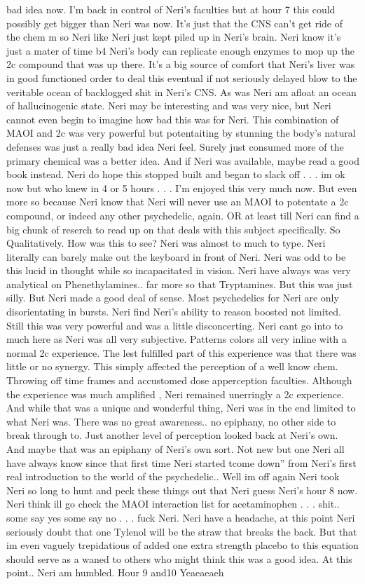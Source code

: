 \documentclass[12pt]{book}
\begin{document}
bad idea now. I'm back in control of Neri's faculties but at hour 7 this could possibly get bigger than Neri was now. It's just that the CNS can't get ride of the chem m so Neri like Neri just kept piled up in Neri's brain. Neri know it's just a mater of time b4 Neri's body can replicate enough enzymes to mop up the 2c compound that was up there. It's a big source of comfort that Neri's liver was in good functioned order to deal this eventual if not seriously delayed blow to the veritable ocean of backlogged shit in Neri's CNS. As was Neri am afloat an ocean of hallucinogenic state. Neri may be interesting and was very nice, but Neri cannot even begin to imagine how bad this was for Neri. This combination of MAOI and 2c was very powerful but potentaiting by stunning the body's natural defenses was just a really bad idea Neri feel. Surely just consumed more of the primary chemical was a better idea. And if Neri was available, maybe read a good book instead. Neri do hope this stopped built and began to slack off . . .  im ok now but who knew in 4 or 5 hours . . .  I'm enjoyed this very much now. But even more so because Neri know that Neri will never use an MAOI to potentate a 2c compound, or indeed any other psychedelic, again. OR at least till Neri can find a big chunk of reserch to read up on that deals with this subject specifically. So Qualitatively. How was this to see? Neri was almost to much to type. Neri literally can barely make out the keyboard in front of Neri. Neri was odd to be this lucid in thought while so incapacitated in vision. Neri have always was very analytical on Phenethylamines.. far more so that Tryptamines. But this was just silly. But Neri made a good deal of sense. Most psychedelics for Neri are only disorientating in bursts. Neri find Neri's ability to reason boosted not limited. Still this was very powerful and was a little disconcerting. Neri cant go into to much here as Neri was all very subjective. Patterns colors all very inline with a normal 2c experience. The lest fulfilled part of this experience was that there was little or no synergy. This simply affected the perception of a well know chem. Throwing off time frames and accustomed dose apperception faculties. Although the experience was much amplified , Neri remained unerringly a 2c experience. And while that was a unique and wonderful thing, Neri was in the end limited to what Neri was. There was no great awareness.. no epiphany, no other side to break through to. Just another level of perception looked back at Neri's own. And maybe that was an epiphany of Neri's own sort. Not new but one Neri all have always know since that first time Neri started tcome down'' from Neri's first real introduction to the world of the psychedelic.. Well im off again Neri took Neri so long to hunt and peck these things out that Neri guess Neri's hour 8 now. Neri think ill go check the MAOI interaction list for acetaminophen . . .  shit.. some say yes some say no . . .  fuck Neri. Neri have a headache, at this point Neri seriously doubt that one Tylenol will be the straw that breaks the back. But that im even vaguely trepidatious of added one extra strength placebo to this equation should serve as a waned to others who might think this was a good idea. At this point.. Neri am humbled. Hour 9 and10 Yeaeaeaeh 
\end{document}

